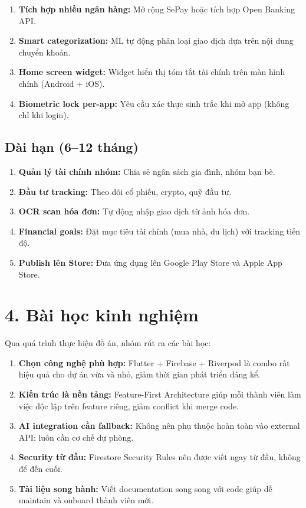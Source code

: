\begin{enumerate}
  \item \textbf{Tích hợp nhiều ngân hàng:} Mở rộng SePay hoặc tích hợp Open Banking API.
  \item \textbf{Smart categorization:} ML tự động phân loại giao dịch dựa trên nội dung chuyển khoản.
  \item \textbf{Home screen widget:} Widget hiển thị tóm tắt tài chính trên màn hình chính (Android + iOS).
  \item \textbf{Biometric lock per-app:} Yêu cầu xác thực sinh trắc khi mở app (không chỉ khi login).
\end{enumerate}

\subsection*{Dài hạn (6--12 tháng)}

\begin{enumerate}
  \item \textbf{Quản lý tài chính nhóm:} Chia sẻ ngân sách gia đình, nhóm bạn bè.
  \item \textbf{Đầu tư tracking:} Theo dõi cổ phiếu, crypto, quỹ đầu tư.
  \item \textbf{OCR scan hóa đơn:} Tự động nhập giao dịch từ ảnh hóa đơn.
  \item \textbf{Financial goals:} Đặt mục tiêu tài chính (mua nhà, du lịch) với tracking tiến độ.
  \item \textbf{Publish lên Store:} Đưa ứng dụng lên Google Play Store và Apple App Store.
\end{enumerate}

\section*{4. Bài học kinh nghiệm}

Qua quá trình thực hiện đồ án, nhóm rút ra các bài học:

\begin{enumerate}
  \item \textbf{Chọn công nghệ phù hợp:} Flutter + Firebase + Riverpod là combo rất hiệu quả cho dự án vừa và nhỏ, giảm thời gian phát triển đáng kể.
  \item \textbf{Kiến trúc là nền tảng:} Feature-First Architecture giúp mỗi thành viên làm việc độc lập trên feature riêng, giảm conflict khi merge code.
  \item \textbf{AI integration cần fallback:} Không nên phụ thuộc hoàn toàn vào external API; luôn cần cơ chế dự phòng.
  \item \textbf{Security từ đầu:} Firestore Security Rules nên được viết ngay từ đầu, không để đến cuối.
  \item \textbf{Tài liệu song hành:} Viết documentation song song với code giúp dễ maintain và onboard thành viên mới.
\end{enumerate}
